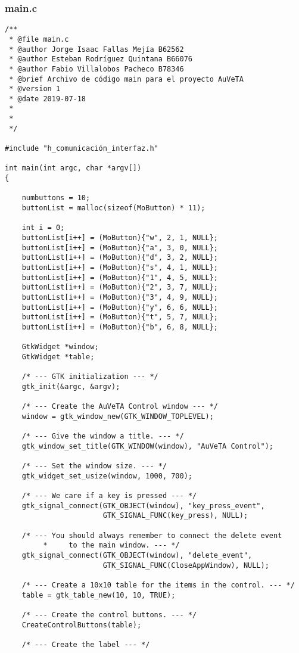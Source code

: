 \subsubsection{main.c}
\begin{lstlisting}
/**
 * @file main.c
 * @author Jorge Isaac Fallas Mejía B62562
 * @author Esteban Rodríguez Quintana B66076
 * @author Fabio Villalobos Pacheco B78346
 * @brief Archivo de código main para el proyecto AuVeTA
 * @version 1
 * @date 2019-07-18
 *
 *
 */

#include "h_comunicación_interfaz.h"

int main(int argc, char *argv[])
{

	numbuttons = 10;
	buttonList = malloc(sizeof(MoButton) * 11);

	int i = 0;
	buttonList[i++] = (MoButton){"w", 2, 1, NULL};
	buttonList[i++] = (MoButton){"a", 3, 0, NULL};
	buttonList[i++] = (MoButton){"d", 3, 2, NULL};
	buttonList[i++] = (MoButton){"s", 4, 1, NULL};
	buttonList[i++] = (MoButton){"1", 4, 5, NULL};
	buttonList[i++] = (MoButton){"2", 3, 7, NULL};
	buttonList[i++] = (MoButton){"3", 4, 9, NULL};
	buttonList[i++] = (MoButton){"y", 6, 6, NULL};
	buttonList[i++] = (MoButton){"t", 5, 7, NULL};
	buttonList[i++] = (MoButton){"b", 6, 8, NULL};

	GtkWidget *window;
	GtkWidget *table;

	/* --- GTK initialization --- */
	gtk_init(&argc, &argv);

	/* --- Create the AuVeTA Control window --- */
	window = gtk_window_new(GTK_WINDOW_TOPLEVEL);

	/* --- Give the window a title. --- */
	gtk_window_set_title(GTK_WINDOW(window), "AuVeTA Control");

	/* --- Set the window size. --- */
	gtk_widget_set_usize(window, 1000, 700);

	/* --- We care if a key is pressed --- */
	gtk_signal_connect(GTK_OBJECT(window), "key_press_event",
					   GTK_SIGNAL_FUNC(key_press), NULL);

	/* --- You should always remember to connect the delete event
         *     to the main window. --- */
	gtk_signal_connect(GTK_OBJECT(window), "delete_event",
					   GTK_SIGNAL_FUNC(CloseAppWindow), NULL);

	/* --- Create a 10x10 table for the items in the control. --- */
	table = gtk_table_new(10, 10, TRUE);

	/* --- Create the control buttons. --- */
	CreateControlButtons(table);

	/* --- Create the label --- */




\end{lstlisting}
